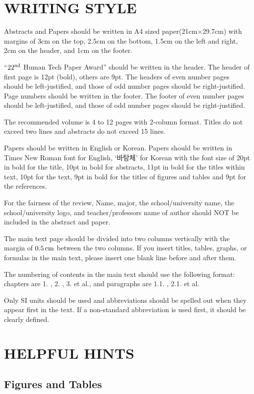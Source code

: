 \documentclass{fullpaper_hutech}
\begin{document}
\section{WRITING STYLE}
Abstracts and Papers should be written in A4 sized paper(21cm$\times$29.7cm) with margins of 3cm on the top, 2.5cm on the bottom, 1.5cm on the left and right, 2cm on the header, and 1cm on the footer.

``$22^{\rm nd}$ Human Tech Paper Award'' should be written in the header. The header of first page is 12pt (bold), others are 9pt. The headers of even number pages should be left-justified, and those of odd number pages should be right-justified. Page numbers should be written in the footer. The footer of even number pages should be left-justified, and those of odd number pages should be right-justified.

The recommended volume is 4 to 12 pages with 2-column format. Titles do not exceed two lines and abstracts do not exceed 15 lines.

Papers should be written in English or Korean. Papers should be written in Times New Roman font for English, `바탕체' for Korean with the font size of 20pt in bold for the title, 10pt in bold for abstracts, 11pt in bold for the titles within text, 10pt for the text, 9pt in bold for the titles of figures and tables and 9pt for the references.

For the fairness of the review, Name, major, the school/university name, the school/university logo, and teacher/professors name of author should NOT be included in the abstract and paper. 

The main text page should be divided into two columns vertically with the margin of $0.5\,\rm cm$ between the two columns. If you insert titles, tables, graphs, or formulas in the main text, please insert one blank line before and after them.

The numbering of contents in the main text should use the following format: chapters are 1. , 2. , 3. et al., and paragraphs are 1.1. , 2.1. et al.

Only SI units should be used and abbreviations should be spelled out when they appear first in the text. If a non-standard abbreviation is used first, it should be clearly defined.

\section{HELPFUL HINTS}

\subsection{Figures and Tables}
\end{document}

